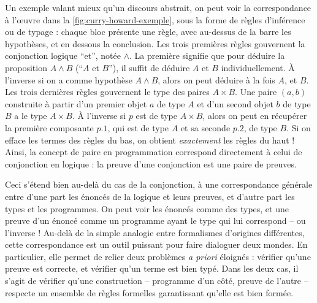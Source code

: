 Un exemple valant mieux qu’un discours abstrait, on peut voir la correspondance à l’œuvre dans la \cref{fig:curry-howard-exemple}, sous la forme de règles d’inférence
ou de typage : chaque bloc présente une règle, avec au-dessus de la barre les
hypothèses, et en dessous la conclusion.
Les trois premières règles gouvernent la conjonction logique “et”, notée $\wedge$.
La première signifie que pour déduire la proposition $A \wedge B$ (“$A$ et $B$”),
il suffit de déduire $A$ et $B$ individuellement.
À l’inverse si on a comme hypothèse $A \wedge B$, alors on peut déduire à la fois $A$, et $B$.
Les trois dernières règles gouvernent le type des paires $A \times B$.
Une paire $(a,b)$ construite à partir d’un premier objet $a$ de type $A$%
 et d’un second objet $b$ de type $B$ a le type $A \times B$.
À l’inverse si $p$ est de type $A \times B$, alors on peut en récupérer la première composante
$p.1$, qui est de type $A$ et sa seconde $p.2$, de type $B$.
Si on efface les termes des règles du bas, on obtient \emph{exactement} les règles du haut !
Ainsi, la concept de paire en programmation correspond directement à celui de conjonction
en logique : la preuve d’une conjonction est une paire de preuves.

Ceci s’étend bien au-delà du cas de la conjonction,
à une correspondance générale entre d’une part les énoncés de la logique et leurs preuves,
et d’autre part les types et les programmes. On peut voir les énoncés comme des types,
et une preuve d’un énoncé comme un programme ayant le type qui lui correspond – ou l’inverse !
Au-delà de la simple analogie entre formalismes d’origines différentes, cette correspondance est un outil puissant pour faire dialoguer deux mondes.
En particulier, elle permet de relier deux problèmes \textit{a priori} éloignés :
vérifier qu’une preuve est correcte, et vérifier qu’un terme est bien typé.
Dans les deux cas, il s’agit de vérifier qu’une construction – programme d’un côté,
preuve de l’autre – respecte un ensemble de règles formelles garantissant qu’elle est
bien formée.

